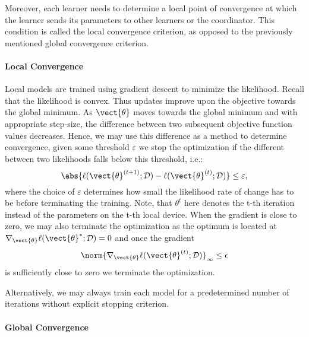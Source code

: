 Moreover, each learner needs to determine a local point of convergence at which the learner sends its parameters to other learners or the coordinator. 
This condition is called the local convergence criterion, as opposed to the previously mentioned global convergence criterion.

\paragraph*{Local Convergence}
Local models are trained using gradient descent to minimize the likelihood. 
Recall that the likelihood is convex. 
Thus updates improve upon the objective towards the global minimum.
As $\vect{\theta}$ moves towards the global minimum and with appropriate step-size, the difference between two subsequent objective function values decreases.
Hence, we may use this difference as a method to determine convergence, given some threshold $\varepsilon$ we stop the optimization if the different between two likelihoods falls below this threshold, i.e.:
\begin{equation}
    \label{eq:stopcrit}
    \abs{\ell(\vect{\theta}^{(t+1)} ; \mathcal{D}) - \ell(\vect{\theta}^{(t)} ; \mathcal{D})} \leq \varepsilon,
\end{equation}
where the choice of $\varepsilon$ determines how small the likelihood rate of change has to be before terminating the training.
Note, that $\theta^t$ here denotes the t-th iteration instead of the parameters on the t-th local device.
When the gradient is close to zero, we may also terminate the optimization as the optimum is located at $\nabla_{\vect{\theta}} \ell(\vect{\theta}^{*} ; \mathcal{D}) = 0$ and once the gradient
\begin{equation}
    \norm{\nabla_{\vect{\theta}} \ell(\vect{\theta}^{(t)} ; \mathcal{D})}_{\infty} \leq \epsilon
\end{equation}
is sufficiently close to zero we terminate the optimization. 

Alternatively, we may always train each model for a predetermined number of iterations without explicit stopping criterion.

\paragraph*{Global Convergence}

